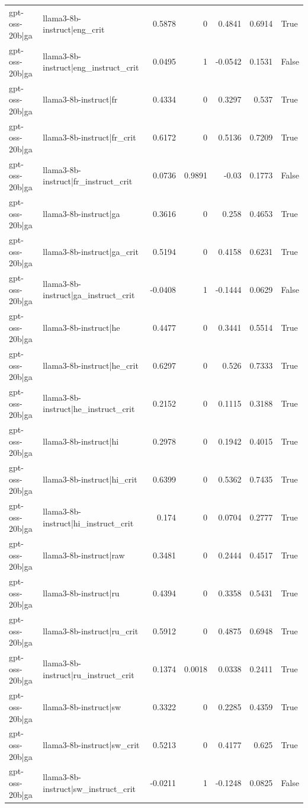 \begin{table}
\begin{tabular}{l l r r r r l}
gpt-oss-20b|ga & llama3-8b-instruct|eng_crit & 0.5878 & 0 & 0.4841 & 0.6914 & True \\
gpt-oss-20b|ga & llama3-8b-instruct|eng_instruct_crit & 0.0495 & 1 & -0.0542 & 0.1531 & False \\
gpt-oss-20b|ga & llama3-8b-instruct|fr & 0.4334 & 0 & 0.3297 & 0.537 & True \\
gpt-oss-20b|ga & llama3-8b-instruct|fr_crit & 0.6172 & 0 & 0.5136 & 0.7209 & True \\
gpt-oss-20b|ga & llama3-8b-instruct|fr_instruct_crit & 0.0736 & 0.9891 & -0.03 & 0.1773 & False \\
gpt-oss-20b|ga & llama3-8b-instruct|ga & 0.3616 & 0 & 0.258 & 0.4653 & True \\
gpt-oss-20b|ga & llama3-8b-instruct|ga_crit & 0.5194 & 0 & 0.4158 & 0.6231 & True \\
gpt-oss-20b|ga & llama3-8b-instruct|ga_instruct_crit & -0.0408 & 1 & -0.1444 & 0.0629 & False \\
gpt-oss-20b|ga & llama3-8b-instruct|he & 0.4477 & 0 & 0.3441 & 0.5514 & True \\
gpt-oss-20b|ga & llama3-8b-instruct|he_crit & 0.6297 & 0 & 0.526 & 0.7333 & True \\
gpt-oss-20b|ga & llama3-8b-instruct|he_instruct_crit & 0.2152 & 0 & 0.1115 & 0.3188 & True \\
gpt-oss-20b|ga & llama3-8b-instruct|hi & 0.2978 & 0 & 0.1942 & 0.4015 & True \\
gpt-oss-20b|ga & llama3-8b-instruct|hi_crit & 0.6399 & 0 & 0.5362 & 0.7435 & True \\
gpt-oss-20b|ga & llama3-8b-instruct|hi_instruct_crit & 0.174 & 0 & 0.0704 & 0.2777 & True \\
gpt-oss-20b|ga & llama3-8b-instruct|raw & 0.3481 & 0 & 0.2444 & 0.4517 & True \\
gpt-oss-20b|ga & llama3-8b-instruct|ru & 0.4394 & 0 & 0.3358 & 0.5431 & True \\
gpt-oss-20b|ga & llama3-8b-instruct|ru_crit & 0.5912 & 0 & 0.4875 & 0.6948 & True \\
gpt-oss-20b|ga & llama3-8b-instruct|ru_instruct_crit & 0.1374 & 0.0018 & 0.0338 & 0.2411 & True \\
gpt-oss-20b|ga & llama3-8b-instruct|sw & 0.3322 & 0 & 0.2285 & 0.4359 & True \\
gpt-oss-20b|ga & llama3-8b-instruct|sw_crit & 0.5213 & 0 & 0.4177 & 0.625 & True \\
gpt-oss-20b|ga & llama3-8b-instruct|sw_instruct_crit & -0.0211 & 1 & -0.1248 & 0.0825 & False \\

\end{tabular}
\end{table}

